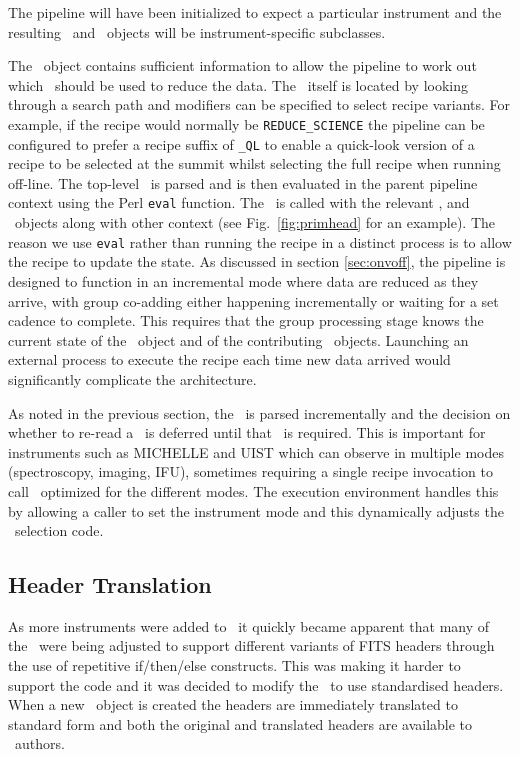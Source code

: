 \documentclass[final,authoryear,5p,times,twocolumn]{elsarticle}
\begin{document}
The pipeline will have been initialized to expect a particular instrument and
the resulting \Frame\ and \Group\ objects will be instrument-specific subclasses.

The \Frame\ object contains sufficient information to allow the
pipeline to work out which \recipe\ should be used to reduce the
data. The \recipe\ itself is located by looking through a search path
and modifiers can be specified to select recipe variants. For example,
if the recipe would normally be \texttt{REDUCE\_SCIENCE} the pipeline
can be configured to prefer a recipe suffix of \texttt{\_QL} to
enable a quick-look version of a recipe to be selected at the summit
whilst selecting the full recipe when running off-line.
The top-level \recipe\ is parsed and is then evaluated in the
parent pipeline context using the Perl \texttt{eval} function. The
\recipe\ is called with the relevant \Frame, and \Group\ objects along
with other context (see Fig.\ \ref{fig:primhead} for an example). The
reason we use \texttt{eval} rather than running the recipe in a
distinct process is to allow the recipe to update the state. As
discussed in section \ref{sec:onvoff}, the pipeline is designed to
function in an incremental mode where data are reduced as they arrive,
with group co-adding either happening incrementally or waiting for a
set cadence to complete. This requires that the group processing stage
knows the current state of the \Group\ object and of the contributing
\Frame\ objects. Launching an external process to execute the
recipe each time new data arrived would significantly complicate the
architecture.

As noted in the previous section, the \recipe\ is parsed incrementally
and the decision on whether to re-read a \primitive\ is deferred until
that \primitive\ is required. This is important for instruments such
as MICHELLE and UIST which can observe in multiple modes
(spectroscopy, imaging, IFU), sometimes
requiring a single recipe invocation to call \primitives\ optimized
for the different modes. The execution environment handles this by
allowing a caller to set the instrument mode and this dynamically
adjusts the \primitive\ selection code.

\subsection{Header Translation}

As more instruments were added to \oracdr\ it quickly became apparent
that many of the \primitives\ were being adjusted to support different
variants of FITS headers through the use of repetitive if/then/else
constructs. This was making it harder to support the code and it was
decided to modify the \primitives\ to use standardised headers. When a
new \Frame\ object is created the headers are immediately translated
to standard form and both the original and translated headers are
available to \primitive\ authors.
\end{document}
